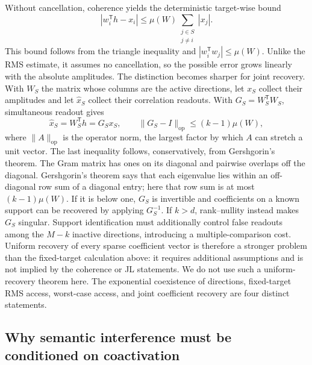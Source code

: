 \documentclass[
  aps,
  reprint,
  superscriptaddress,
  floatfix,
  nofootinbib,
  longbibliography
]{revtex4-2}
\newcommand{\Msem}{M}
\newcommand{\T}{^{\mathsf{T}}}
\newcommand{\opnorm}[1]{\lVert #1 \rVert_{\mathrm{op}}}
\begin{document}
Without cancellation, coherence yields the deterministic target-wise bound
\begin{equation}
\label{eq:worst-readout}
|w_i\T h-x_i|
\leq
\mu(W)\sum_{\substack{j\in S\\j\ne i}}|x_j|.
\end{equation}
This bound follows from the triangle inequality and
$|w_i\T w_j|\leq\mu(W)$.  Unlike the RMS estimate, it assumes no cancellation,
so the possible error grows linearly with the absolute amplitudes.
The distinction becomes sharper for joint recovery.  With $W_S$ the matrix
whose columns are the active directions, let $x_S$ collect their amplitudes and
let $\widehat{x}_S$ collect their correlation readouts.  With
$G_S=W_S\T W_S$, simultaneous readout gives
\begin{equation}
\label{eq:joint-readout}
\widehat{x}_S
=W_S\T h
=G_Sx_S,
\qquad
\opnorm{G_S-I}
\leq(k-1)\mu(W),
\end{equation}
where $\opnorm{A}$ is the operator norm, the largest factor by which $A$ can
stretch a unit vector.  The last inequality follows, conservatively, from
Gershgorin's theorem.
The Gram matrix has ones on its diagonal and pairwise overlaps off the
diagonal.  Gershgorin's theorem says that each eigenvalue lies within an
off-diagonal row sum of a diagonal entry; here that row sum is at most
$(k-1)\mu(W)$.  If it is below one, $G_S$ is invertible and coefficients on a
known support can be recovered by applying $G_S^{-1}$.  If $k>d$, rank--nullity
instead makes $G_S$ singular.
Support identification must additionally control false readouts among the
$\Msem-k$ inactive directions, introducing a multiple-comparison cost.
Uniform recovery of every sparse coefficient vector is therefore a stronger
problem than the fixed-target calculation above: it requires additional
assumptions and is not implied by the coherence or JL statements.  We do not
use such a uniform-recovery theorem here.
The exponential coexistence of directions, fixed-target RMS access, worst-case
access, and joint coefficient recovery are four distinct statements.

\subsection{Why semantic interference must be conditioned on coactivation}
\label{sec:coactivation-diagnostic}
\end{document}
